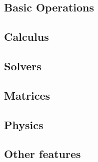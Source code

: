 
\subsection{Basic Operations}

\subsection{Calculus}

\subsection{Solvers}

\subsection{Matrices}

\subsection{Physics}


\subsection{Other features}
